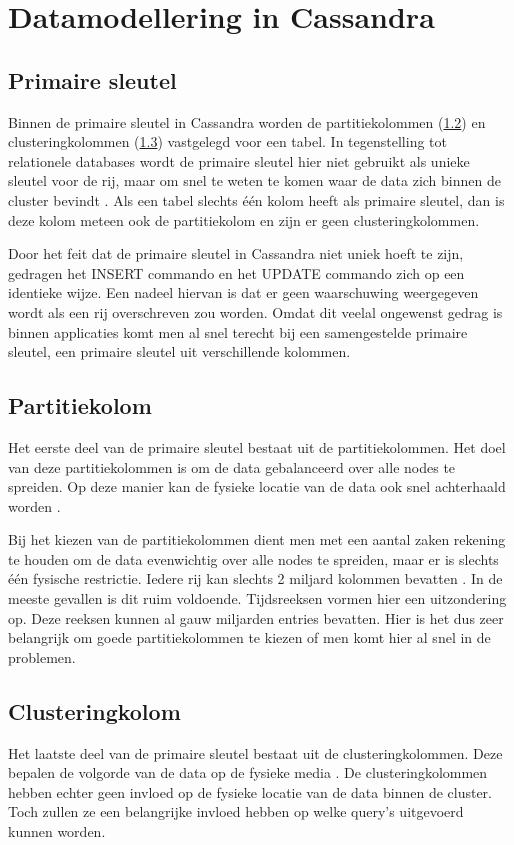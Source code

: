 \chapter{Datamodellering in Cassandra}
\label{ch:cassandra_modelling}
\section{Primaire sleutel}
Binnen de primaire sleutel in Cassandra worden de partitiekolommen (\ref{partition_key}) en clusteringkolommen (\ref{clustering_key}) vastgelegd voor een tabel.
In tegenstelling tot relationele databases wordt de primaire sleutel hier niet gebruikt als unieke sleutel voor de rij, maar om snel te weten te komen waar de data zich binnen de cluster bevindt \citep{kan2014cassandra}.
Als een tabel slechts één kolom heeft als primaire sleutel, dan is deze kolom meteen ook de partitiekolom en zijn er geen clusteringkolommen.

Door het feit dat de primaire sleutel in Cassandra niet uniek hoeft te zijn, gedragen het INSERT commando en het UPDATE commando zich op een identieke wijze.
Een nadeel hiervan is dat er geen waarschuwing weergegeven wordt als een rij overschreven zou worden.
Omdat dit veelal ongewenst gedrag is binnen applicaties komt men al snel terecht bij een samengestelde primaire sleutel, een primaire sleutel uit verschillende kolommen.

\section{Partitiekolom}
\label{partition_key}
Het eerste deel van de primaire sleutel bestaat uit de partitiekolommen.
Het doel van deze partitiekolommen is om de data gebalanceerd over alle nodes te spreiden.
Op deze manier kan de fysieke locatie van de data ook snel achterhaald worden \citep{kan2014cassandra}.

Bij het kiezen van de partitiekolommen dient men met een aantal zaken rekening te houden om de data evenwichtig over alle nodes te spreiden, maar er is slechts één fysische restrictie.
Iedere rij kan slechts 2 miljard kolommen bevatten \citep{McFadin2013Timeseries}.
In de meeste gevallen is dit ruim voldoende.
Tijdsreeksen vormen hier een uitzondering op.
Deze reeksen kunnen al gauw miljarden entries bevatten.
Hier is het dus zeer belangrijk om  goede partitiekolommen te kiezen of men komt hier al snel in de problemen.

\section{Clusteringkolom}
\label{clustering_key}
Het laatste deel van de primaire sleutel bestaat uit de clusteringkolommen.
Deze bepalen de volgorde van de data op de fysieke media \citep{strickland2014availability}.
De clusteringkolommen hebben echter geen invloed op de fysieke locatie van de data binnen de cluster.
Toch zullen ze een belangrijke invloed hebben op welke query's uitgevoerd kunnen worden.

